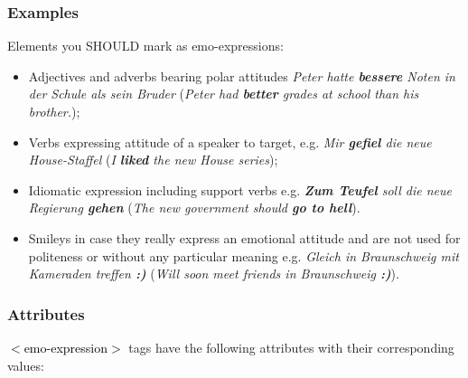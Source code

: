 \documentclass[11pt,a4paper]{article}
\newcommand{\xmltag}[1]{\textcolor{black}{{\small$<$#1$>$}}}
\begin{document}
\subsubsection{Examples}
Elements you SHOULD mark as emo-expressions:
\begin{itemize}
  \item Adjectives and adverbs bearing polar attitudes \textit{Peter
    hatte \textbf{bessere} Noten in der Schule als sein Bruder}
    (\textit{Peter had \textbf{better} grades at school than his
    brother.});

  \item Verbs expressing attitude of a speaker to target,
    e.g. \textit{Mir \textbf{gefiel} die neue House-Staffel}
    (\textit{I \textbf{liked} the new House series});

  \item Idiomatic expression including support verbs
    e.g. \textit{\textbf{Zum Teufel} soll die neue Regierung
      \textbf{gehen}} (\textit{The new government should \textbf{go to
        hell}}).

  \item Smileys in case they really express an emotional attitude and
    are not used for politeness or without any particular meaning
    e.g. \textit{Gleich in Braunschweig mit Kameraden treffen
        \textbf{:)}} (\textit{Will soon meet friends in Braunschweig
        \textbf{:)}}).
\end{itemize}

\subsubsection{Attributes}
\xmltag{emo-expression} tags have the following attributes with their corresponding values:
\end{document}
